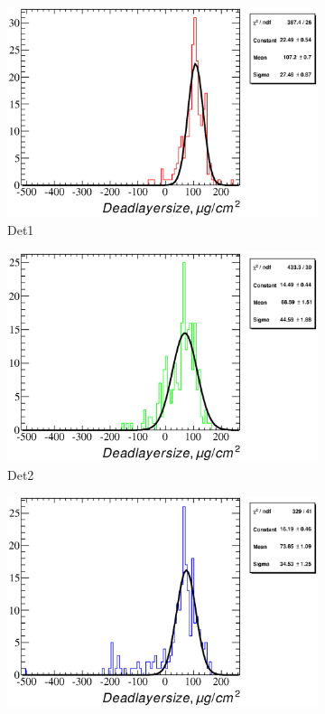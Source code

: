 \documentclass[a4paper,12pt]{article}
\begin{document}
\begin{figure}
\begin{subfigure}[b]{0.325\textwidth}
\includegraphics[width=\textwidth]{gfx/run13_alpha_study/Y2U/c_hDeadLayerSize_by_run_distribution1_Y2U.eps}
\caption{Det1}
\end{subfigure}
\hfill
\begin{subfigure}[b]{0.325\textwidth}
\includegraphics[width=\textwidth]{gfx/run13_alpha_study/Y2U/c_hDeadLayerSize_by_run_distribution2_Y2U.eps}
\caption{Det2}
\end{subfigure}
\hfill
\begin{subfigure}[b]{0.325\textwidth}
\includegraphics[width=\textwidth]{gfx/run13_alpha_study/Y2U/c_hDeadLayerSize_by_run_distribution3_Y2U.eps}

\end{subfigure}
\end{figure}
\end{document}
